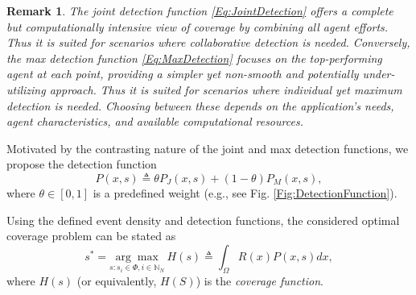 \documentclass[letterpaper, 10 pt, conference]{ieeeconf}
\newcommand{\N}{\mathbb{N}}
\newtheorem{remark}{Remark}
\begin{document}
\begin{remark}\label{Rm:DetectionFunction}
The joint detection function \eqref{Eq:JointDetection} offers a complete but computationally intensive view of coverage by combining all agent efforts. Thus it is suited for scenarios where collaborative detection is needed. Conversely, the max detection function \eqref{Eq:MaxDetection} focuses on the top-performing agent at each point, providing a simpler yet non-smooth and potentially under-utilizing approach. Thus it is suited for scenarios where individual yet maximum detection is needed. Choosing between these depends on the application's needs, agent characteristics, and available computational resources.
\end{remark}




Motivated by the contrasting nature of the joint and max detection functions, we propose the detection function
\begin{equation}\label{Eq:DetectionFunction}
    P(x,s) \triangleq \theta P_J(x,s) + (1-\theta) P_M(x,s),
\end{equation}
where $\theta\in[0,1]$ is a predefined weight (e.g., see Fig. \ref{Fig:DetectionFunction}).  


Using the defined event density and detection functions, the considered optimal coverage problem can be stated as 
\begin{equation}\label{Eq:CoverageProblem}
 s^* = \underset{s:s_i\in \Phi, i\in \N_N}{\arg\max}\ H(s) \triangleq \int_\Omega R(x)P(x,s)dx,  
\end{equation}
where $H(s)$ (or equivalently, $H(S)$) is the \emph{coverage function}.
\end{document}
